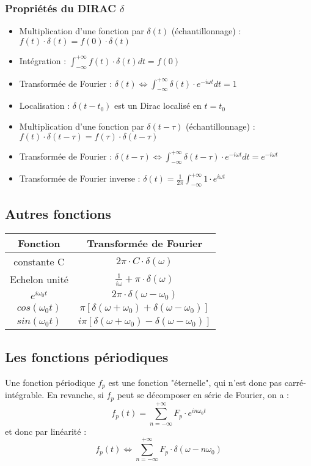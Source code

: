 \documentclass[10pt,a4paper,twoside]{article}
\begin{document}
\subsubsection{Propriétés du DIRAC $\delta$}
\begin{itemize}
\item Multiplication d'une fonction par $\delta(t)$ (échantillonnage) : $f(t)\cdot \delta(t)=f(0)\cdot \delta(t)$
\item Intégration : $\int_{-\infty}^{+\infty}f(t)\cdot \delta(t)dt = f(0)$
\item Transformée de Fourier : $\delta(t) \Leftrightarrow \int_{-\infty}^{+\infty}\delta(t)\cdot e^{-i\omega t}dt=1$
\item Localisation : $\delta(t-t_{0})$ est un Dirac localisé en $t=t_{0}$
\item Multiplication d'une fonction par $\delta(t-\tau)$ (échantillonnage) : $f(t)\cdot \delta(t-\tau)=f(\tau)\cdot \delta(t-\tau)$
\item Transformée de Fourier : $\delta(t-\tau) \Leftrightarrow \int_{-\infty}^{+\infty}\delta(t-\tau)\cdot e^{-i\omega t}dt=e^{-i\omega t}$
\item Transformée de Fourier inverse : $\delta(t)=\frac{1}{2\pi}\int_{-\infty}^{+\infty}1 \cdot e^{i\omega t}$
\end{itemize}

\subsection{Autres fonctions}
\begin{tabular}{|c|c|}
\hline 
Fonction & Transformée de Fourier \\ 
\hline 
constante C &  $2\pi\cdot C\cdot \delta(\omega)$ \\ 
\hline 
Echelon unité & $\frac{1}{i\omega}+\pi \cdot \delta(\omega)$\\
\hline
$e^{i\omega_{0}t}$ & $2\pi \cdot \delta(\omega-\omega_{0})$\\
\hline
$cos(\omega_{0}t)$ & $\pi[\delta(\omega+\omega_{0})+\delta(\omega-\omega_{0})]$\\
\hline
$sin(\omega_{0}t)$ & $i\pi[\delta(\omega+\omega_{0})-\delta(\omega-\omega_{0})]$\\
\hline
\end{tabular} 

\subsection{Les fonctions périodiques}
Une fonction périodique $f_{p}$ est une fonction "éternelle", qui n'est donc pas carré-intégrable. En revanche, si $f_{p}$ peut se décomposer en série de Fourier, on a :
$$f_{p}(t) = \sum_{n=-\infty}^{+\infty} F_{p}\cdot e^{in\omega_{0}t}$$
et donc par linéarité :
$$f_{p}(t) \Leftrightarrow \sum_{n=-\infty}^{+\infty} F_{p}\cdot \delta(\omega-n\omega_{0})$$
\end{document}
